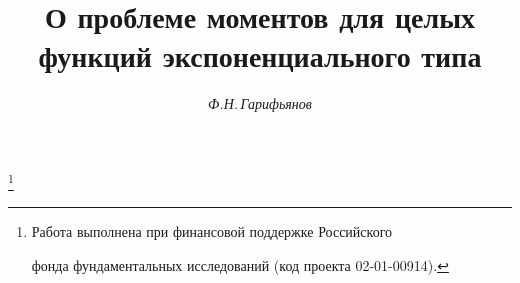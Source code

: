 




%





\newcommand{\C}{\bold C}


\newcommand{\sgn}{\operatorname{sign}}


\newcommand{\im}{\operatorname{Im}}


\newcommand{\tts}[1]{}







\setcounter{page}{37}















\author{\it Ф.Н.\,Гарифьянов}




\title{О проблеме моментов для целых функций экспоненциального типа}


\thanks{Работа выполнена при финансовой поддержке Российского


фонда фундаментальных исследований (код проекта 02-01-00914).}





\date{}




\pagestyle{plain} %







\maketitle


